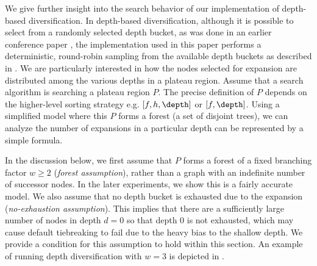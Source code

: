 We give further insight into the search behavior of our implementation of depth-based diversification.
In depth-based diversification, although it is possible to select from a randomly selected depth bucket, as was done in an earlier conference paper \cite{Asai2016},
the implementation used in this paper performs a deterministic, round-robin sampling from the available depth buckets as described in .
% 
We are particularly interested in how the nodes selected for expansion are distributed 
among the various depths in a plateau region.
Assume that a search algorithm is searching a plateau region $P$.
The precise definition of $P$ depends on the higher-level sorting strategy e.g. $[f,h,\depth]$ or $[f,\depth]$.
% 
Using a simplified model where this $P$ forms a forest (a set of disjoint trees),
we can analyze the number of expansions in a particular depth
can be represented by a simple formula. 




% 
In the discussion below, 
we first assume that $P$ forms a forest of a fixed branching factor
$w\geq 2$ (\emph{forest assumption}), rather than a graph with an indefinite number of successor nodes.
In the later experiments, we show this is a fairly accurate model.
We also assume that no depth bucket is exhausted due to the expansion (\emph{no-exhaustion assumption}). This implies that there are a sufficiently large number of nodes in depth $d=0$ so that depth 0 is not exhausted, which may cause \fifo default tiebreaking to fail due to the heavy bias to the shallow depth.
We provide a condition for this assumption to hold within this section.
An example of running depth diversification with $w=3$ is depicted in .


